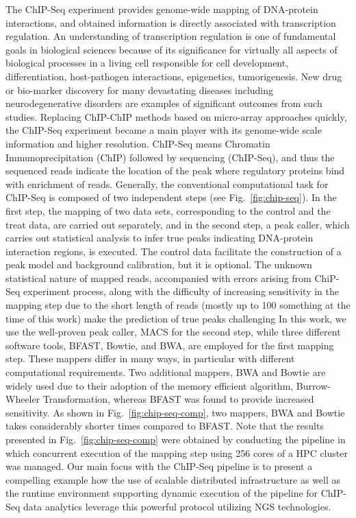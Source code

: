 \documentclass{cpeauth}
\begin{document}
 The ChIP-Seq experiment provides genome-wide mapping of DNA-protein
 interactions, and obtained information is directly associated with
 transcription regulation\cite{pepke2009, laajala, wilbanks}.  An
 understanding of transcription regulation is one of fundamental goals
 in biological sciences because of its significance for virtually all
 aspects of biological processes in a living cell responsible for cell
 development, differentiation, host-pathogen interactions,
 epigenetics, tumorigenesis.  New drug or bio-marker discovery for
 many devastating diseases including neurodegenerative disorders are
 examples of significant outcomes from such studies\cite{pepke2009}.
 Replacing ChIP-ChIP methods based on micro-array approaches quickly,
 the ChIP-Seq experiment became a main player with its genome-wide
 scale information and higher resolution.  ChIP-Seq means Chromatin
 Immunoprecipitation (ChIP) followed by sequencing (ChIP-Seq), and
 thus the sequenced reads indicate the location of the peak where
 regulatory proteins bind with enrichment of reads. Generally, the
 conventional computational task for ChIP-Seq is composed of two
 independent steps (see Fig.~\ref{fig:chip-seq}).  In the first step,
 the mapping of two data sets, corresponding to the control and the
 treat data, are carried out separately, and in the second step, a
 peak caller, which carries out statistical analysis to infer true
 peaks indicating DNA-protein interaction regions, is executed.  The
 control data facilitate the construction of a peak model and
 background calibration, but it is optional. The unknown statistical
 nature of mapped reads, accompanied with errors arising from ChiP-Seq
 experiment process, along with the difficulty of increasing
 sensitivity in the mapping step due to the short length of reads
 (mostly up to 100 something at the time of this work) make the
 prediction of true peaks challenging\cite{pepke2009,laajala,wilbanks}
 In this work, we use the well-proven peak caller, MACS\cite{macs} for
 the second step, while three different software tools, BFAST, Bowtie,
 and BWA, are employed for the first mapping step.  These mappers
 differ in many ways, in particular with different computational
 requirements.  Two additional mappers, BWA and Bowtie are widely used
 due to their adoption of the memory efficient algorithm,
 Burrow-Wheeler Transformation, whereas BFAST was found to provide
 increased sensitivity\cite{bfast2009,mapping-survey}.  As shown in
 Fig.~\ref{fig:chip-seq-comp}, two mappers, BWA and Bowtie takes
 considerably shorter times compared to BFAST.  Note that the results
 presented in Fig.~\ref{fig:chip-seq-comp} were obtained by conducting
 the pipeline in which concurrent execution of the mapping step using
 256 cores of a HPC cluster was managed.  Our main focus with the
 ChIP-Seq pipeline is to present a compelling example how the use of
 scalable distributed infrastructure as well as the runtime
 environment supporting dynamic execution of the pipeline for ChIP-Seq
 data analytics leverage this powerful protocol utilizing NGS
 technologies.
\end{document}
